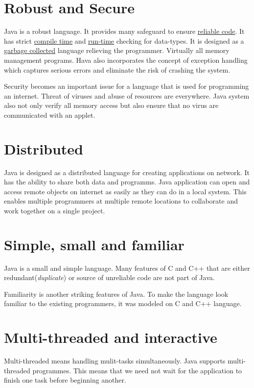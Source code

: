 \documentclass[11pt, a4paper]{book}
\begin{document}
    \section{Robust and Secure}
      Java is a robust language. It provides many safeguard to ensure \ul{reliable code}. It has strict \ul{compile time} and \ul{run-time} checking for data-types. It is designed as a \ul{garbage collected} language relieving the programmer. Virtually all memory management programs. Hava also
      incorporates the concept of exception handling which captures serious errors and eliminate the risk of crashing the system.
  
      Security becomes an important issue for a language that is used for programming an internet. Threat of viruses and abuse of resources are everywhere. Java system also not only verify all memory access but also ensure that no virus are communicated with an applet.
  
    \section{Distributed}
      Java is designed as a distributed language for creating applications on network. It has the ability to share both data and programms. Java application can open and access remote objects on internet as easily as they can do in a local system. This enables multiple programmers at multiple remote
      locations to collaborate and work together on a single project.
  
    \section{Simple, small and familiar}
      Java is a small and simple language. Many features of C and C++ that are either redundant(\textit{duplicate}) or source of unreliable code are not part of Java.
  
      Familiarity is another striking features of Java. To make the language look familiar to the existing programmers, it was modeled on C and C++ language.
  
    \section{Multi-threaded and interactive}
      Multi-threaded means handling mulit-tasks simultaneously. Java supports multi-threaded programmes. This means that we need not wait for the application to finish one task before beginning another.
  
\end{document}
